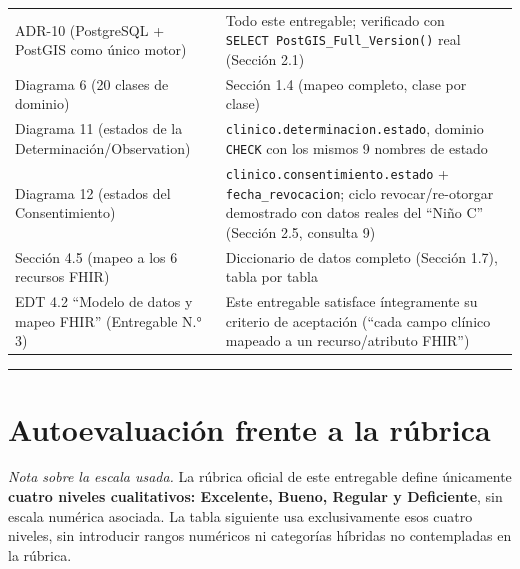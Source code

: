 \documentclass[11pt,a4paper]{article}
\begin{document}
{\begin{longtable}[]{@{}
  >{\raggedright\arraybackslash}p{}
  >{\raggedright\arraybackslash}p{}@{}}
ADR-10 (PostgreSQL + PostGIS como único motor) & Todo este entregable; verificado con \texttt{SELECT\ PostGIS\_Full\_Version()} real (Sección 2.1) \\
Diagrama 6 (20 clases de dominio) & Sección 1.4 (mapeo completo, clase por clase) \\
Diagrama 11 (estados de la Determinación/Observation) & \texttt{clinico.determinacion.estado}, dominio \texttt{CHECK} con los mismos 9 nombres de estado \\
Diagrama 12 (estados del Consentimiento) & \texttt{clinico.consentimiento.estado} + \texttt{fecha\_revocacion}; ciclo revocar/re-otorgar demostrado con datos reales del ``Niño C'' (Sección 2.5, consulta 9) \\
Sección 4.5 (mapeo a los 6 recursos FHIR) & Diccionario de datos completo (Sección 1.7), tabla por tabla \\
EDT 4.2 ``Modelo de datos y mapeo FHIR'' (Entregable N.° 3) & Este entregable satisface íntegramente su criterio de aceptación (``cada campo clínico mapeado a un recurso/atributo FHIR'') \\
\end{longtable}
}

\begin{center}\rule{0.5\linewidth}{0.5pt}\end{center}

\section{Autoevaluación frente a la rúbrica}\label{autoevaluaciuxf3n-frente-a-la-ruxfabrica}

\emph{Nota sobre la escala usada.} La rúbrica oficial de este entregable define únicamente \textbf{cuatro niveles cualitativos: Excelente, Bueno, Regular y Deficiente}, sin escala numérica asociada. La tabla siguiente usa exclusivamente esos cuatro niveles, sin introducir rangos numéricos ni categorías híbridas no contempladas en la rúbrica.
\end{document}
